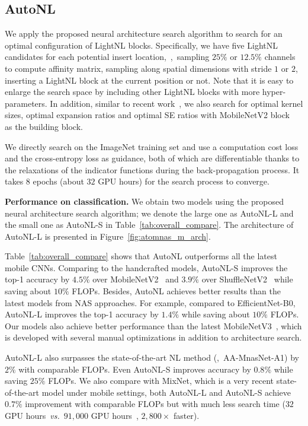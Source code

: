 \documentclass[10pt,twocolumn,letterpaper]{article}
\begin{document}
\subsection{AutoNL}\label{sec:exp_search}
We apply the proposed neural architecture search algorithm to search for an optimal configuration of LightNL blocks. Specifically, we have five LightNL candidates for each potential insert location,~\ie,~sampling $25\%$ or $12.5\%$ channels to compute affinity matrix, sampling along spatial dimensions with stride $1$ or $2$, inserting a LightNL block at the current position or not. Note that it is easy to enlarge the search space by including other LightNL blocks with more hyper-parameters. In addition, similar to recent work~\cite{tan2019mnasnet,wu2019fbnet,han2019proxyless,stamoulis2019single}, we also search for optimal kernel sizes, optimal expansion ratios and optimal SE ratios with MobileNetV2 block~\cite{sandler2018mobilenetv2} as the building block.

We directly search on the ImageNet training set and use a computation cost loss and the cross-entropy loss as guidance, both of which are differentiable thanks to the relaxations of the indicator functions during the back-propagation process. It takes $8$ epochs (about $32$ GPU hours) for the search process to converge. 

\vspace{0.5ex}\noindent\textbf{Performance on classification.}
We obtain two models using the proposed neural architecture search algorithm; we denote the large one as AutoNL-L and the small one as AutoNL-S in Table~\ref{tab:overall_compare}. The architecture of AutoNL-L is presented in Figure~\ref{fig:atomnas_m_arch}.

Table~\ref{tab:overall_compare} shows that AutoNL outperforms all the latest mobile CNNs. Comparing to the handcrafted models, AutoNL-S improves the top-1 accuracy by $4.5\%$ over MobileNetV2~\cite{sandler2018mobilenetv2} and $3.9\%$ over ShuffleNetV2~\cite{ma2018shufflenet} while saving about $10\%$ FLOPs. Besides, AutoNL achieves better results than the latest models from NAS approaches. For example, compared to EfficientNet-B0, AutoNL-L improves the top-1 accuracy by $1.4\%$ while saving about $10\%$ FLOPs. Our models also achieve better performance than the latest MobileNetV3~\cite{howard2019searching}, which is developed with several manual optimizations in addition to architecture search.

AutoNL-L also surpasses the state-of-the-art NL method (\ie,~AA-MnasNet-A1) by $2\%$ with comparable FLOPs. Even AutoNL-S improves accuracy by $0.8\%$ while saving $25\%$ FLOPs. We also compare with MixNet, which is a very recent state-of-the-art model under mobile settings, both AutoNL-L and AutoNL-S achieve $0.7\%$ improvement with comparable FLOPs but with much less search time ($32$ GPU hours~\emph{vs.}~$91,000$ GPU hours~\cite{wu2019fbnet}, $2,800\times$ faster).
\end{document}
